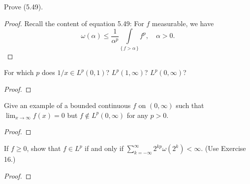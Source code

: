 \begin{problem}
Prove (5.49).
\end{problem}
\begin{proof}
Recall the content of equation 5.49: For $f$ measurable, we have
\begin{equation}
  \label{eq:11:chebyshevs-inequality}
\omega(\alpha)\leq\frac{1}{\alpha^p}\int\limits_{\{\,f>\alpha\,\}}f^p,\quad\alpha>0.
\end{equation}
\end{proof}
\newpage

\begin{problem}
For which $p$ does $1/x\in L^p(0,1)$? $L^p(1,\infty)$? $L^p(0,\infty)$?
\end{problem}
\begin{proof}
\end{proof}
\newpage

\begin{problem}
Give an example of a bounded continuous $f$ on $(0,\infty)$ such that
$\lim_{x\to\infty}f(x)=0$ but $f\notin L^p(0,\infty)$ for any $p>0$.
\end{problem}
\begin{proof}
\end{proof}
\newpage

\begin{problem}
If $f\geq 0$, show that $f\in L^p$ if and only if $\sum_{k=-\infty}^\infty
2^{kp}\omega(2^k)<\infty$. (Use Exercise 16.)
\end{problem}
\begin{proof}
\end{proof}

